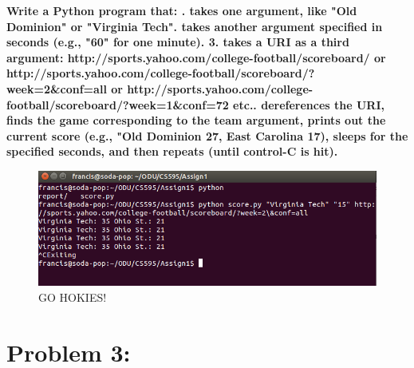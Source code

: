 \documentclass{article}
\begin{document}
{\bf Write a Python program that: . takes one argument, like "Old Dominion" or "Virginia Tech". takes another argument specified in seconds (e.g., "60" for 
     one minute).
  3. takes a URI as a third argument: \newline
     http://sports.yahoo.com/college-football/scoreboard/ \newline
     or\newline
     http://sports.yahoo.com/college-football/scoreboard/?week=2\&conf=all\newline
     or\newline
     http://sports.yahoo.com/college-football/scoreboard/?week=1\&conf=72\newline
     etc.. dereferences the URI, finds the game corresponding to the team
     argument, prints out the current score (e.g., "Old Dominion 27, 
     East Carolina 17), sleeps for the specified seconds, and then
     repeats (until control-C is hit).\newline
} 





\begin{figure}[h!]
    \includegraphics[width=\textwidth]{prob2_running}
    \caption{GO HOKIES!}
\end{figure}

\newpage
\section{Problem 3:}
\label{Problem 3}
\end{document}
